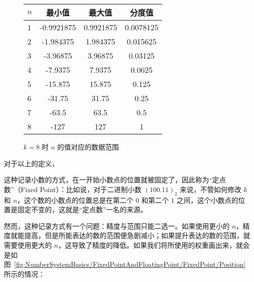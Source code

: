         \begin{figure}
            \centering
            \begin{tabular}{lS[table-format=-3.7]S[table-format=-3.7]S[table-format=-3.7]}
                $n$ & 最小值     & 最大值    & 分度值    \\    & -0.9921875 & 0.9921875  & 0.0078125 \\
                2   & -1.984375  & 1.984375   & 0.015625  \\
                3   & -3.96875   & 3.96875    & 0.03125   \\
                4   & -7.9375    & 7.9375     & 0.0625    \\
                5   & -15.875    & 15.875     & 0.125     \\
                6   & -31.75     & 31.75      & 0.25      \\
                7   & -63.5      & 63.5       & 0.5       \\
                8   & -127       & 127        & 1         \\
            \end{tabular}
            \caption{$k = 8$ 时 $n$ 的值对应的数据范围}
            \label{fig:NumberSystemBasics/FixedPointAndFloatingPoint/FixedPoint/DataRange}
        \end{figure}

        对于以上的定义，

        这种记录小数的方式，在一开始小数点的位置就被固定了，因此称为“定点数”（Fixed Point）：比如说，对于二进制小数 $(100.11)_2$ 来说，不管如何修改 $k$ 和 $n$，这个数的小数点的位置总是在第二个 $0$ 和第二个 $1$ 之间，这个小数点的位置是固定不变的，这就是“定点数”一名的来源。

        然而，这种记录方式有一个问题：精度与范围只能二选一。如果使用更小的 $n$，精度就能提高，但是所能表达的数的范围便急剧减小；如果提升表达的数的范围，就需要使用更大的 $n$，这导致了精度的降低。如果我们将所使用的权重画出来，就会是如图~\ref{fig:NumberSystemBasics/FixedPointAndFloatingPoint/FixedPoint/Position} 所示的情况：

